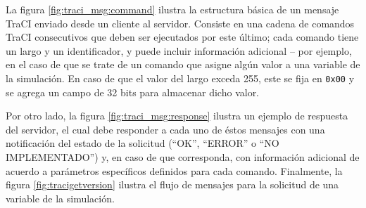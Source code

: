La figura \ref{fig:traci_msg:command} ilustra la estructura básica de un mensaje TraCI enviado desde un cliente al servidor. Consiste en una cadena de comandos TraCI consecutivos que deben ser ejecutados por este último; cada comando tiene un largo y un identificador, y puede incluir información adicional -- por ejemplo, en el caso de que se trate de un comando que asigne algún valor a una variable de la simulación. En caso de que el valor del largo exceda 255, este se fija en \texttt{0x00} y se agrega un campo de 32 bits para almacenar dicho valor.

Por otro lado, la figura \ref{fig:traci_msg:response} ilustra un ejemplo de respuesta del servidor, el cual debe responder a cada uno de éstos mensajes con una notificación del estado de la solicitud (``OK'', ``ERROR'' o ``NO IMPLEMENTADO'') y, en caso de que corresponda, con información adicional de acuerdo a parámetros específicos definidos para cada comando. Finalmente, la figura \ref{fig:tracigetversion} ilustra el flujo de mensajes para la solicitud de una variable de la simulación.

